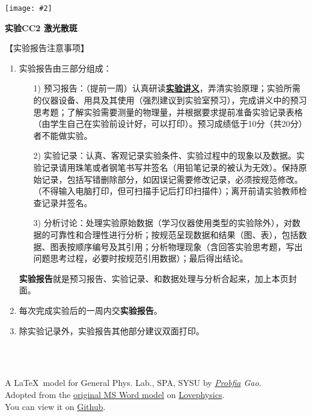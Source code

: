 \documentclass[11pt,a4paper]{ctexart}
\newcommand{\ExpeName}{实验CC2 激光散斑}
\newcommand{\cpic}[2]{
\begin{center}
\texttt{[image: \#2]}
\end{center}
}
\begin{document}
\cpic{0.255}{e1}%
\begin{center}
\LARGE\textbf{{\ExpeName}}
\end{center}
\large{【实验报告注意事项】}
\begin{enumerate}
 \item 实验报告由三部分组成：
 \begin{enumerate}
  \item[1)]预习报告：（提前一周）认真研读\textbf{\uline{实验讲义}}，弄清实验原理；实验所需的仪器设备、用具及其使用（强烈建议到实验室预习），完成讲义中的预习思考题；了解实验需要测量的物理量，并根据要求提前准备实验记录表格（由学生自己在实验前设计好，可以打印）。预习成绩低于10分（共20分）者不能做实验。
  \item[2)]实验记录：认真、客观记录实验条件、实验过程中的现象以及数据。实验记录请用珠笔或者钢笔书写并签名（{\color{red}用铅笔记录的被认为无效}）。{\color{red}保持原始记录，包括写错删除部分，如因误记需要修改记录，必须按规范修改。}（不得输入电脑打印，但可扫描手记后打印扫描件）；离开前请实验教师检查记录并签名。
  \item[3)]分析讨论：处理实验原始数据（学习仪器使用类型的实验除外），对数据的可靠性和合理性进行分析；按规范呈现数据和结果（图、表），包括数据、图表按顺序编号及其引用；分析物理现象（含回答实验思考题，写出问题思考过程，必要时按规范引用数据）；最后得出结论。
 \end{enumerate}
 \textbf{实验报告}就是预习报告、实验记录、和数据处理与分析合起来，加上本页封面。
 \item 每次完成实验后的一周内交\textbf{实验报告}。
 \item 除实验记录外，实验报告其他部分建议双面打印。
\end{enumerate}
\ 
\\
\ 

\begin{flushright}                                                           %
\tiny{
A \LaTeX \ model for General Phys. Lab., SPA, SYSU by {\em \href{https://www.weibo.com/3532532974/profile?rightmod=1&wvr=6&mod=personinfo&is_all=1}{Probfia} Gao.}\\ Adopted from the \href{http://lovephysics.sysu.edu.cn/lib/exe/fetch.php?media=courses:secondlevelzhuhai:report.docx}{original MS Word model} on \href{http://lovephysics.sysu.edu.cn}{Lovephysics}.\\ You can view it on \href{https://github.com/Probfia/SYSU_GPL_C}{Github}.}
\end{flushright}
\end{document}
